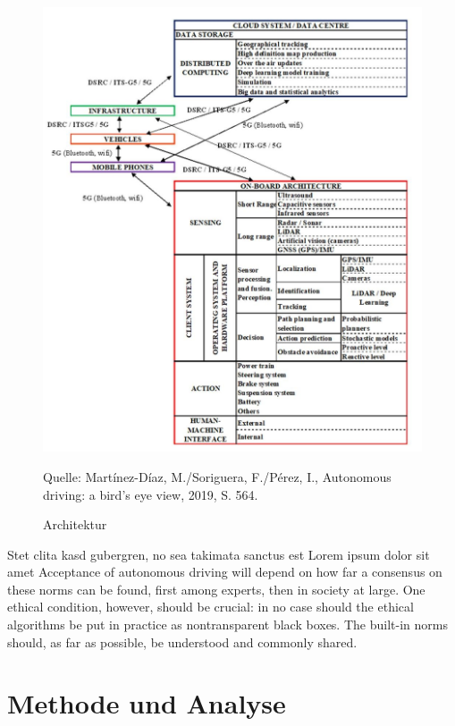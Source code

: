 \begin{figure}
	\caption[Architektur]{Architektur}
	\centering
	\includegraphics[]{assets/figures/Architektur.jpg}
	\begin{flushleft}
		Quelle: Martínez-Díaz, M./Soriguera, F./Pérez, I., Autonomous driving: a bird's eye view, 2019, S. 564.	
	\end{flushleft}														
\end{figure}

Stet clita kasd gubergren, no sea takimata sanctus est Lorem ipsum dolor sit amet Acceptance of autonomous driving will depend on how far a consensus on these norms can be found, first among experts, then in society at large. 
One ethical condition, however, should be crucial: in no case should the ethical algorithms be put in practice as nontransparent black boxes. 
The built-in norms should, as far as possible, be understood and commonly shared.

\chapter{Methode und Analyse}

